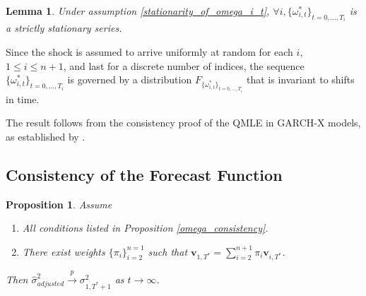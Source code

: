 \documentclass[11pt,3p,review,authoryear]{elsarticle}
\newcommand{\weight}{\pi}
\newtheorem{lem}{Lemma}
\newtheorem{prop}{Proposition}
\theoremstyle{definition}
\newenvironment{proof-of-proposition}[1][{}]{\noindent{\bf
    Proof of Proposition {#1}}
  \hspace*{.5em}}{\qed\bigskip\\}
\newenvironment{proof-of-lemma}[1][{}]{\noindent{\bf
Proof of Lemma {#1}}
\hspace*{.5em}}{\qed\bigskip\\}
\begin{document}
\begin{lem}
  Under assumption \ref{stationarity_of_omega_i_t}, $\forall i, \{\omega_{i,t}^{*}\}_{t=0,...,T_i}$ is a strictly stationary series.
\end{lem}

\begin{proof-of-lemma}
Since the shock is assumed to arrive uniformly at random for each $i$, $1 \leq i \leq n + 1$, and last for a discrete number of indices, the sequence $\{\omega_{i,t}^{*}\}_{t=0,...,T_i}$ is governed by a distribution $F_{\{\omega_{i,t}^{*}\}_{t=0,...,T_i}}$ that is invariant to shifts in time.
\end{proof-of-lemma}

\begin{proof-of-proposition}
The result follows from the consistency proof of the QMLE in GARCH-X models, as established by \citet{han2014asymptotic}. 
\end{proof-of-proposition}

  \subsection{Consistency of the Forecast Function}
  \begin{prop}\label{sigma_consistency}
    Assume
    \begin{enumerate}
      \item All conditions listed in Proposition \ref{omega_consistency}.
      \item There exist weights $\{\pi_{i}\}_{i=2}^{n=1}$ such that $\textbf{v}_{1,T^{*}} = \sum^{n+1}_{i=2}\weight_{i} \textbf{v}_{i,T^{*}}$.
     \end{enumerate}
  Then $\hat\sigma^{2}_{adjusted}\xrightarrow{p}\sigma^{2}_{1,T^{*}+1}$ as $t\rightarrow\infty$. 
  \end{prop}
\end{document}
